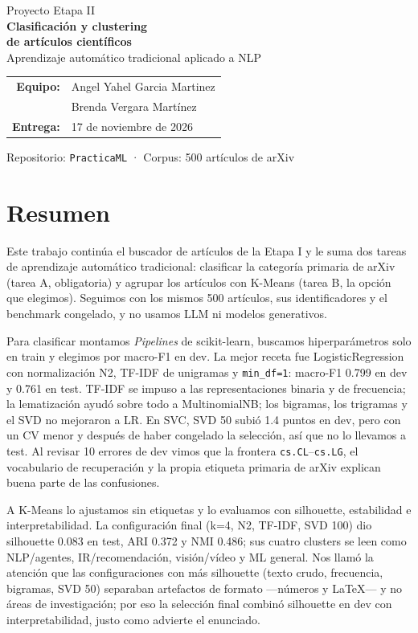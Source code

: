 \documentclass[11pt,a4paper]{article}
\newcommand{\code}[1]{\texttt{#1}}
\begin{document}
\begin{titlepage}
\centering
\vspace*{2.2cm}
{\Large Proyecto Etapa II}\\[0.5cm]
{\Huge\bfseries Clasificación y clustering\\[0.2cm] de artículos científicos}\\[1.2cm]
{\large Aprendizaje automático tradicional aplicado a NLP}\\[2.2cm]
\begin{tabular}{rl}
\textbf{Equipo:} & Angel Yahel Garcia Martinez\\[0.1cm]
 & Brenda Vergara Martínez\\[0.2cm]
\textbf{Entrega:} & 17 de noviembre de 2026\\
\end{tabular}
\vfill
{\small Repositorio: \code{PracticaML} · Corpus: 500 artículos de arXiv}
\end{titlepage}

\tableofcontents
\newpage

\section*{Resumen}

Este trabajo continúa el buscador de artículos de la Etapa I y le suma dos tareas de
aprendizaje automático tradicional: clasificar la categoría primaria de arXiv (tarea A,
obligatoria) y agrupar los artículos con K-Means (tarea B, la opción que elegimos).
Seguimos con los mismos 500 artículos, sus identificadores y el benchmark congelado, y no
usamos LLM ni modelos generativos.

Para clasificar montamos \emph{Pipelines} de scikit-learn, buscamos hiperparámetros solo
en train y elegimos por macro-F1 en dev. La mejor receta fue LogisticRegression con
normalización N2, TF-IDF de unigramas y \code{min\_df=1}: macro-F1 0.799 en dev y 0.761 en
test. TF-IDF se impuso a las representaciones binaria y de frecuencia; la lematización
ayudó sobre todo a MultinomialNB; los bigramas, los trigramas y el SVD no mejoraron a LR.
En SVC, SVD 50 subió 1.4 puntos en dev, pero con un CV menor y después de haber congelado
la selección, así que no lo llevamos a test. Al revisar 10 errores de dev vimos que la
frontera \code{cs.CL}--\code{cs.LG}, el vocabulario de recuperación y la propia etiqueta
primaria de arXiv explican buena parte de las confusiones.

A K-Means lo ajustamos sin etiquetas y lo evaluamos con silhouette, estabilidad e
interpretabilidad. La configuración final (k=4, N2, TF-IDF, SVD 100) dio silhouette 0.083 en
test, ARI 0.372 y NMI 0.486; sus cuatro clusters se leen como NLP/agentes,
IR/recomendación, visión/vídeo y ML general. Nos llamó la atención que las configuraciones
con más silhouette (texto crudo, frecuencia, bigramas, SVD 50) separaban artefactos de
formato —números y LaTeX— y no áreas de investigación; por eso la selección final combinó
silhouette en dev con interpretabilidad, justo como advierte el enunciado.
\end{document}

